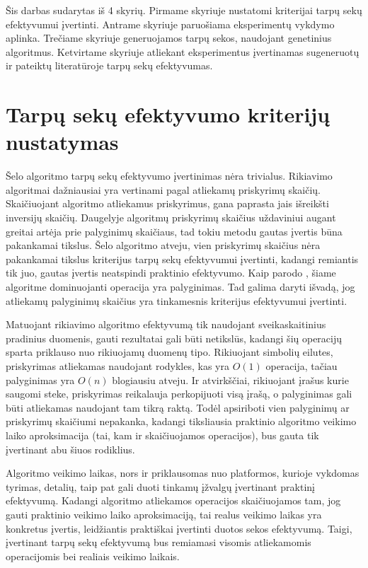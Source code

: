 \documentclass{VUMIFInfKursinis}
\begin{document}
Šis darbas sudarytas iš 4 skyrių.
Pirmame skyriuje nustatomi kriterijai tarpų sekų efektyvumui įvertinti.
Antrame skyriuje paruošiama eksperimentų vykdymo aplinka.
Trečiame skyriuje generuojamos tarpų sekos, naudojant genetinius algoritmus.
Ketvirtame skyriuje atliekant eksperimentus įvertinamas sugeneruotų ir pateiktų literatūroje tarpų sekų efektyvumas.

\section{Tarpų sekų efektyvumo kriterijų nustatymas}

Šelo algoritmo tarpų sekų efektyvumo įvertinimas nėra trivialus.
Rikiavimo algoritmai dažniausiai yra vertinami pagal atliekamų priskyrimų skaičių.
Skaičiuojant algoritmo atliekamus priskyrimus, gana paprasta jais išreikšti inversijų skaičių. %
Daugelyje algoritmų priskyrimų skaičius uždaviniui augant greitai artėja prie palyginimų skaičiaus,
tad tokiu metodu gautas įvertis būna pakankamai tikslus.
Šelo algoritmo atveju, vien priskyrimų skaičius nėra pakankamai tikslus kriterijus tarpų sekų efektyvumui įvertinti,
kadangi remiantis tik juo, gautas įvertis neatspindi praktinio efektyvumo.
Kaip parodo \cite{ciura2001best}, šiame algoritme dominuojanti operacija yra palyginimas.
Tad galima daryti išvadą, jog atliekamų palyginimų skaičius yra tinkamesnis kriterijus efektyvumui įvertinti.

Matuojant rikiavimo algoritmo efektyvumą tik naudojant sveikaskaitinius pradinius duomenis, gauti rezultatai gali būti netikslūs,
kadangi šių operacijų sparta priklauso nuo rikiuojamų duomenų tipo.
Rikiuojant simbolių eilutes, priskyrimas atliekamas naudojant rodykles, kas yra $O(1)$ operacija,
tačiau palyginimas yra $O(n)$ blogiausiu atveju.
Ir atvirkščiai, rikiuojant įrašus kurie saugomi steke, priskyrimas reikalauja perkopijuoti visą įrašą,
o palyginimas gali būti atliekamas naudojant tam tikrą raktą.
Todėl apsiriboti vien palyginimų ar priskyrimų skaičiumi nepakanka, kadangi tiksliausia praktinio algoritmo
veikimo laiko aproksimacija (tai, kam ir skaičiuojamos operacijos), bus gauta tik įvertinant abu šiuos rodiklius.

Algoritmo veikimo laikas, nors ir priklausomas nuo platformos, kurioje vykdomas tyrimas, detalių,
taip pat gali duoti tinkamų įžvalgų įvertinant praktinį efektyvumą.
Kadangi algoritmo atliekamos operacijos skaičiuojamos tam, jog gauti praktinio
veikimo laiko aproksimaciją, tai realus veikimo laikas
yra konkretus įvertis, leidžiantis praktiškai įvertinti duotos sekos efektyvumą.
Taigi, įvertinant tarpų sekų efektyvumą bus remiamasi visomis atliekamomis operacijomis bei realiais veikimo laikais.
\end{document}
